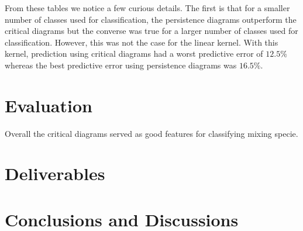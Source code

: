 \documentclass[12pt, fullpage,letterpaper]{article}
\theoremstyle{definition}
\begin{document}
	From these tables we notice a few curious details. The first is that for a smaller number of classes used for classification, the persistence diagrams outperform the critical diagrams but the converse was true for a larger number of classes used for classification. However, this was not the case for the linear kernel. With this kernel, prediction using critical diagrams had a worst predictive error of $12.5\%$ whereas the best predictive error using persistence diagrams was $16.5\%$. 

\section*{\normalfont Evaluation}
Overall the critical diagrams served as good features for classifying mixing specie.

\section*{\normalfont Deliverables} 
\section*{\normalfont Conclusions and Discussions}
{}

\end{document}
